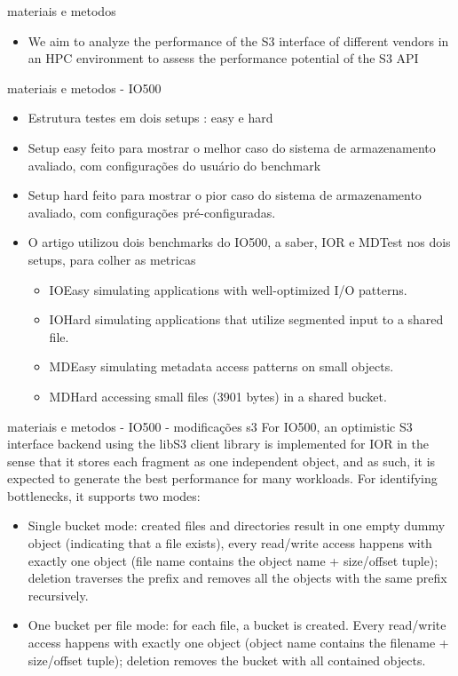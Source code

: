 \documentclass{beamer}
\begin{document}
\begin{frame}{materiais e metodos}
    \begin{itemize}
        \item We aim to analyze the performance of the S3 interface of different vendors in an
HPC environment to assess the performance potential of the S3 API
    \end{itemize}
\end{frame}
\begin{frame}{materiais e metodos - IO500}
	\begin{itemize}
		\item Estrutura testes em dois setups : easy e hard
		\item Setup easy feito para mostrar o melhor caso do sistema de armazenamento avaliado, com configurações do usuário do benchmark
		\item Setup hard feito para mostrar o pior caso do sistema de armazenamento avaliado, com configurações pré-configuradas.
		\item O artigo utilizou dois benchmarks do IO500, a saber, IOR e MDTest nos dois setups, para colher as metricas
		\begin{itemize}
			\item IOEasy simulating applications with well-optimized I/O patterns.
			\item IOHard simulating applications that utilize segmented input to a shared file.
			\item MDEasy simulating metadata access patterns on small objects.
			\item MDHard accessing small files (3901 bytes) in a shared bucket.
		\end{itemize}
		\end{itemize}
	\end{frame}
 \begin{frame}{materiais e metodos - IO500 - modificações s3}
	For IO500, an optimistic S3 interface backend using the libS3 client library is implemented for IOR in the sense that it stores each fragment as one independent object, and as
	such, it is expected to generate the best performance for many workloads.
	For identifying bottlenecks, it supports two modes:
\begin{itemize}
	\item 	Single bucket mode: created files and directories result in one empty dummy object
	(indicating that a file exists), every read/write access happens with exactly one object
	(file name contains the object name + size/offset tuple); deletion traverses the prefix
	and removes all the objects with the same prefix recursively.
	\item	One bucket per file mode: for each file, a bucket is created. Every read/write access
	happens with exactly one object (object name contains the filename + size/offset
	tuple); deletion removes the bucket with all contained objects.
	
\end{itemize}
	
\end{frame}
\end{document}
